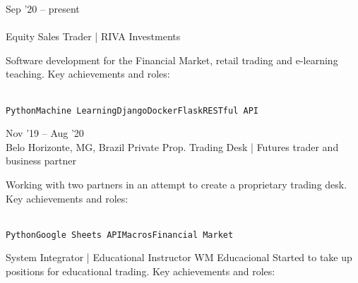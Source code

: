 \documentclass[10pt]{developercv} %
\begin{document}


\begin{entrylist}
  \entry
  {Sep '20 -- present\\\footnotesize{}\\\footnotesize{}}
  {Equity Sales Trader | RIVA Investments}
  {}
  {Software development for the Financial Market, retail trading and e-learning teaching. Key achievements and roles:\\
    \begin{contributionlist}
    \end{contributionlist}\\
    \texttt{Python}\slashsep\texttt{Machine Learning}\slashsep\texttt{Django}\slashsep\texttt{Docker}\slashsep\texttt{Flask}\slashsep\texttt{RESTful API}}
  \entry
  {Nov '19 -- Aug '20\\\footnotesize{Belo Horizonte, MG, Brazil}}
  {Private Prop. Trading Desk | Futures trader and business partner}
  {}
  {Working with two partners in an attempt to create a proprietary trading desk. Key achievements and roles:\\
    \begin{contributionlist}
    \end{contributionlist}\\
    \texttt{Python}\slashsep\texttt{Google Sheets API}\slashsep\texttt{Macros}\slashsep\texttt{Financial Market}}
  {System Integrator | Educational Instructor}
  {WM Educacional}
  {
    Started to take up positions for educational trading. Key achievements and roles:\\
}
\end{entrylist}
\end{document}
